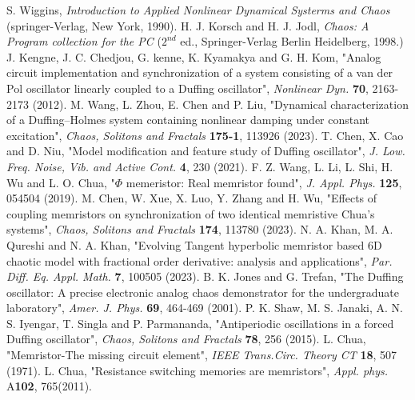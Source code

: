 \documentclass[%
 aip,
cha,
 amsmath,amssymb,
preprint,
]{revtex4-2}
\begin{document}
\begin{thebibliography}{}
S. Wiggins, {\it Introduction to Applied Nonlinear Dynamical Systerms and Chaos} (springer-Verlag, New York, 1990).
H. J. Korsch and H. J. Jodl, {\it Chaos: A Program collection for the PC} ($2^{nd}$ ed., Springer-Verlag Berlin Heidelberg, 1998.)
J. Kengne, J. C. Chedjou, G. kenne, K. Kyamakya and G. H. Kom, "Analog circuit implementation and synchronization of a system consisting of a van der Pol oscillator linearly coupled to a Duffing oscillator", {\it Nonlinear Dyn.} \textbf{70}, 2163-2173 (2012).
M. Wang, L. Zhou, E. Chen and P. Liu, "Dynamical characterization of a Duffing–Holmes system containing nonlinear damping under constant excitation", {\it Chaos, Solitons and Fractals} \textbf{175-1}, 113926 (2023).
T. Chen, X. Cao and D. Niu, "Model modification and feature study of Duffing oscillator", {\it J. Low. Freq. Noise, Vib. and Active Cont.} \textbf{4}, 230 (2021).
F. Z. Wang, L. Li, L. Shi, H. Wu and L. O. Chua, "$\Phi$ memeristor: Real memristor found", {\it J. Appl. Phys.}
\textbf{125}, 054504 (2019).
M. Chen, W. Xue, X. Luo, Y. Zhang and H. Wu, "Effects of coupling memristors on synchronization of two identical memristive Chua's systems", {\it Chaos, Solitons and Fractals} \textbf{174}, 113780 (2023).
N. A. Khan, M. A. Qureshi and N. A. Khan, "Evolving Tangent hyperbolic memristor based 6D chaotic model with fractional order derivative: analysis and applications", {\it Par. Diff. Eq. Appl. Math.} \textbf{7}, 100505 (2023).
B. K. Jones and G. Trefan, "The Duffing oscillator: A precise electronic analog chaos demonstrator for the undergraduate laboratory", {\it Amer. J. Phys.} \textbf{69}, 464-469 (2001).
P. K. Shaw, M. S. Janaki, A. N. S. Iyengar, T. Singla and P. Parmananda, "Antiperiodic oscillations in a forced Duffing oscillator", {\it Chaos, Solitons and Fractals} \textbf{78}, 256 (2015).
L. Chua, "Memristor-The missing circuit element", {\it IEEE Trans.Circ. Theory CT} \textbf{18}, 507 (1971).
L. Chua, "Resistance switching memories are memristors", {\it Appl. phys.} A\textbf{102}, 765(2011).
\end{thebibliography}
\end{document}
